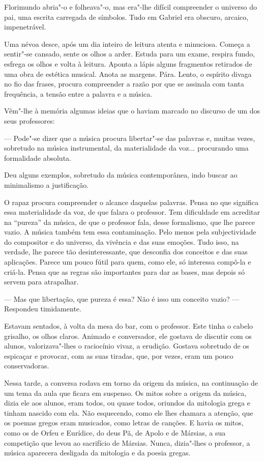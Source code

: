 Florimundo abria"-o e folheava"-o, mas era"-lhe difícil compreender o
universo do pai, uma escrita carregada de símbolos. Tudo em Gabriel era
obscuro, arcaico, impenetrável.

Uma névoa desce, após um dia inteiro de leitura atenta e minuciosa.
Começa a sentir"-se cansado, sente os olhos a arder. Estuda para um
exame, respira fundo, esfrega os olhos e volta à leitura. Aponta a lápis
alguns fragmentos retirados de uma obra de estética musical. Anota as
margens. Pára. Lento, o espírito divaga no fio das frases, procura
compreender a razão por que se assinala com tanta frequência, a tensão
entre a palavra e a música.

Vêm"-lhe à memória algumas ideias que o haviam marcado no discurso de um
dos seus professores:

--- Pode"-se dizer que a música procura libertar"-se das palavras e, muitas
vezes, sobretudo na música instrumental, da materialidade da voz...
procurando uma formalidade absoluta.

Deu alguns exemplos, sobretudo da música contemporânea, indo buscar ao
minimalismo a justificação.

O rapaz procura compreender o alcance daquelas palavras. Pensa no que
significa essa materialidade da voz, de que falara o professor. Tem
dificuldade em acreditar na ``pureza'' da música, de que o professor
fala, desse formalismo, que lhe parece vazio. A música também tem essa
contaminação. Pelo menos pela subjectividade do compositor e do
universo, da vivência e das suas emoções. Tudo isso, na verdade, lhe
parece tão desinteressante, que desconfia dos conceitos e das suas
aplicações. Parece um pouco fútil para quem, como ele, só interessa
compô-la e criá-la. Pensa que as regras são importantes para dar as
bases, mas depois só servem para atrapalhar.

--- Mas que libertação, que pureza é essa? Não é isso um conceito vazio?
--- Respondeu timidamente.

Estavam sentados, à volta da mesa do bar, com o professor. Este tinha o
cabelo grisalho, os olhos claros. Animado e conversador, ele gostava de
discutir com os alunos, valorizava"-lhes o raciocínio vivaz, a erudição.
Gostava sobretudo de os espicaçar e provocar, com as suas tiradas, que,
por vezes, eram um pouco conservadoras.

Nessa tarde, a conversa rodava em torno da origem da música, na
continuação de um tema da aula que ficara em suspenso. Os mitos sobre a
origem da música, dizia ele aos alunos, eram todos, ou quase todos,
oriundos da mitologia grega e tinham nascido com ela. Não esquecendo,
como ele lhes chamara a atenção, que os poemas gregos eram musicados,
como letras de canções. E havia os mitos, como os de Orfeu e Eurídice,
do deus Pã, de Apolo e de Mársias, a sua competição que levou ao
sacrifício de Mársias. Nunca, dizia"-lhes o professor, a música aparecera
desligada da mitologia e da poesia gregas.

